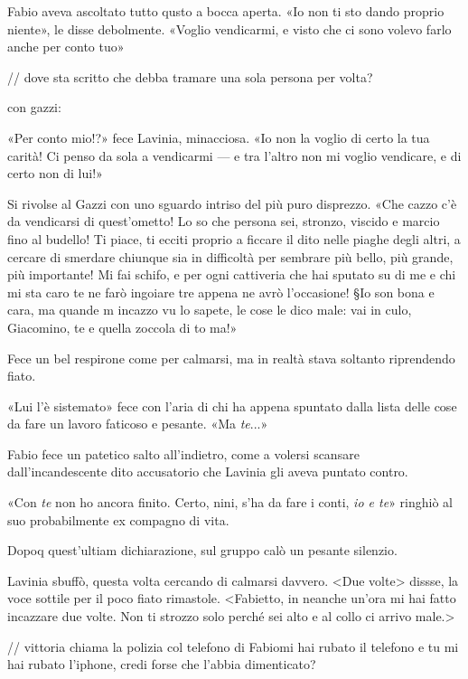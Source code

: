 Fabio aveva ascoltato tutto qusto a bocca aperta. «Io non ti sto dando proprio niente», le disse debolmente. «Voglio vendicarmi, e visto che ci sono volevo farlo anche per conto tuo»

// dove sta scritto che debba tramare una sola persona per volta?

con gazzi:

«Per conto mio!?» fece Lavinia, minacciosa. «Io non la voglio di certo la tua carità! Ci penso da sola a vendicarmi --- e tra l'altro non mi voglio vendicare, e di certo non di lui!»

Si rivolse al Gazzi con uno sguardo intriso del più puro disprezzo. «Che cazzo c'è da vendicarsi di quest'ometto! Lo so che persona sei, stronzo, viscido e marcio fino al budello! Ti piace, ti ecciti proprio a ficcare il dito nelle piaghe degli altri, a cercare di smerdare chiunque sia in difficoltà per sembrare più bello, più grande, più importante! Mi fai schifo, e per ogni cattiveria che hai sputato su di me e chi mi sta caro te ne farò ingoiare tre appena ne avrò l'occasione! §Io son bona e cara, ma quande m incazzo vu lo sapete, le cose le dico male: vai in culo, Giacomino, te e quella zoccola di to ma!»

Fece un bel respirone come per calmarsi, ma in realtà stava soltanto riprendendo fiato.

«Lui l'è sistemato» fece con l'aria di chi ha appena spuntato dalla lista delle cose da fare un lavoro faticoso e pesante. «Ma \emph{te}...»

Fabio fece un patetico salto all'indietro, come a volersi scansare dall'incandescente dito accusatorio che Lavinia gli aveva puntato contro.

«Con \emph{te} non ho ancora finito. Certo, nini, s'ha da fare i conti, \emph{io e te}» ringhiò al suo probabilmente ex compagno di vita.

Dopoq quest'ultiam dichiarazione, sul gruppo calò un pesante silenzio.

Lavinia sbuffò, questa volta cercando di calmarsi davvero. <Due volte> dissse, la voce sottile per il poco fiato rimastole. <Fabietto, in neanche un'ora mi hai fatto incazzare due volte. Non ti strozzo solo perché sei alto e al collo ci arrivo male.>

// vittoria chiama la polizia col telefono di Fabiomi hai rubato il telefono
e tu mi hai rubato l'iphone, credi forse che l'abbia dimenticato?